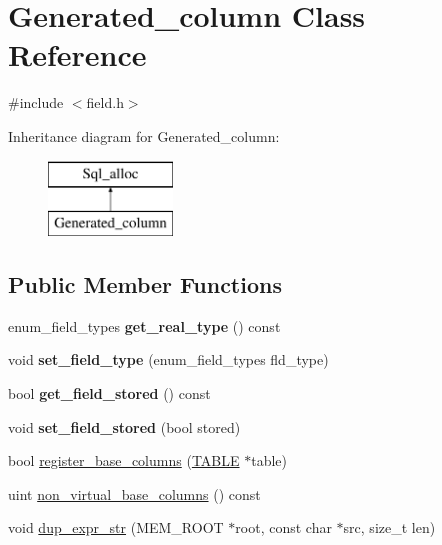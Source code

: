 \hypertarget{classGenerated__column}{}\section{Generated\+\_\+column Class Reference}
\label{classGenerated__column}


{\ttfamily \#include $<$field.\+h$>$}

Inheritance diagram for Generated\+\_\+column\+:\begin{figure}[H]
\begin{center}
\leavevmode
\includegraphics[height=2.000000cm]{classGenerated__column}
\end{center}
\end{figure}
\subsection*{Public Member Functions}
\begin{DoxyCompactItemize}
\item 
\mbox{\label{classGenerated__column_ad104960f26aedc8f5140ed8a009fabe6}} 
enum\+\_\+field\+\_\+types {\bfseries get\+\_\+real\+\_\+type} () const
\item 
\mbox{\label{classGenerated__column_a01bd8966605d51c678d1b3b6c170e5f8}} 
void {\bfseries set\+\_\+field\+\_\+type} (enum\+\_\+field\+\_\+types fld\+\_\+type)
\item 
\mbox{\label{classGenerated__column_ab9b60355251ff6a9b67f5e6cc0f8db92}} 
bool {\bfseries get\+\_\+field\+\_\+stored} () const
\item 
\mbox{\label{classGenerated__column_ae94913913037197ee35158a4f99b7942}} 
void {\bfseries set\+\_\+field\+\_\+stored} (bool stored)
\item 
bool \mbox{\hyperlink{classGenerated__column_a7bedfc60a5b287c7e77c2c2940cf3326}{register\+\_\+base\+\_\+columns}} (\mbox{\hyperlink{structTABLE}{T\+A\+B\+LE}} $\ast$table)
\item 
uint \mbox{\hyperlink{classGenerated__column_a62ca3e4b8e67171cc8f15941537806bb}{non\+\_\+virtual\+\_\+base\+\_\+columns}} () const
\item 
void \mbox{\hyperlink{classGenerated__column_ac51182c81cc5bee54736dbb89380c9c5}{dup\+\_\+expr\+\_\+str}} (M\+E\+M\+\_\+\+R\+O\+OT $\ast$root, const char $\ast$src, size\+\_\+t len)
\end{DoxyCompactItemize}
